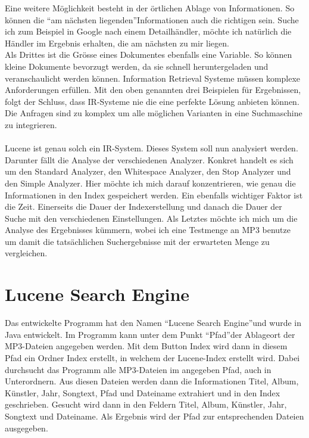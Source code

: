 \documentclass[12pt,a4paper,ngerman]{report}
\begin{document}
Eine weitere Möglichkeit besteht in der örtlichen Ablage von Informationen. So können die \textquotedblleft am nächsten liegenden\textquotedblright Informationen auch die richtigen sein. Suche ich zum Beispiel in Google nach einem Detailhändler, möchte ich natürlich die Händler im Ergebnis erhalten, die am nächsten zu mir liegen.\\
Als Drittes ist die Grösse eines Dokumentes ebenfalls eine Variable. So können kleine Dokumente bevorzugt werden, da sie schnell heruntergeladen und veranschaulicht werden können.
\newpage
Information Retrieval Systeme müssen komplexe Anforderungen erfüllen. Mit den oben genannten drei Beispielen für Ergebnissen, folgt der Schluss, dass IR-Systeme nie die eine perfekte Lösung anbieten können. Die Anfragen sind zu komplex um alle möglichen Varianten in eine Suchmaschine zu integrieren.\\
\\
Lucene ist genau solch ein IR-System. Dieses System soll nun analysiert werden. Darunter fällt die Analyse der verschiedenen Analyzer. Konkret handelt es sich um den Standard Analyzer, den Whitespace Analyzer, den Stop Analyzer und den Simple Analyzer. Hier möchte ich mich darauf konzentrieren, wie genau die Informationen in den Index gespeichert werden. Ein ebenfalls wichtiger Faktor ist die Zeit. Einerseits die Dauer der Indexerstellung und danach die Dauer der Suche mit den verschiedenen Einstellungen. Als Letztes möchte ich mich um die Analyse des Ergebnisses kümmern, wobei ich eine Testmenge an MP3 benutze um damit die tatsächlichen Suchergebnisse mit der erwarteten Menge zu vergleichen.
\section{Lucene Search Engine}
Das entwickelte Programm hat den Namen \textquotedblleft Lucene Search Engine\textquotedblright und wurde in Java entwickelt. Im Programm kann unter dem Punkt \textquotedblleft Pfad\textquotedblright der Ablageort der MP3-Dateien angegeben werden. Mit dem Button Index wird dann in diesem Pfad ein Ordner Index erstellt, in welchem der Lucene-Index erstellt wird. Dabei durchsucht das Programm alle MP3-Dateien im angegeben Pfad, auch in Unterordnern. Aus diesen Dateien werden dann die Informationen Titel, Album, Künstler, Jahr, Songtext, Pfad und Dateiname extrahiert und in den Index geschrieben. Gesucht wird dann in den Feldern Titel, Album, Künstler, Jahr, Songtext und Dateiname. Als Ergebnis wird der Pfad zur entsprechenden Dateien ausgegeben.
\newpage
\end{document}
